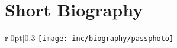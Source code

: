 \documentclass[10pt,a4paper,appendixprefix,pdfusetitle,twocolumn,draft]{scrbook}
\begin{document}
\begin{comment}
http://www.rfc-editor.org/pubprocess.html
RFC2223 Instructions to RFC Authors
RFC3979 BCP79 Intellectual Property Rights in IETF Technology
RFC5378 BCP78 Rights Contributors Provide to the IETF Trust


http://tex.stackexchange.com/questions/36307/formatting-back-references-in-bibliography
http://www.cs.columbia.edu/irt/software/l2x/ l2x -- conversion from LaTeX to other formats Version 1.13
http://ftp.gwdg.de/pub/ctan/support/l2x/
http://tools.ietf.org/tools/xml2rfc2

http://www.zisc.ethz.ch/events/2003-2011/ISC2006Slides/FederrathZISCTalk.pdf

Professorliste
Dr. Christoph Sprenger (Part I)
-Prof. David Basin
Gregory Demay
Peter Gazi
Dr. Srdjan Marinovic
Dr. Sasa Radomirovic
Dr. Ralf Sasse

T. Hoefler
A. Perrig 
-Dr. Jan Camenisch (Keine Berechtigung)

-Srdjan Capkun (Keine Kapazität)
-David Basin  (Keine Kapazität)
\end{comment}

\chapter{Short Biography}
\begin{wrapfigure}[9]{r}[0pt]{0.3\columnwidth}
	\texttt{[image: inc/biography/passphoto]}
\end{wrapfigure}

\end{document}
